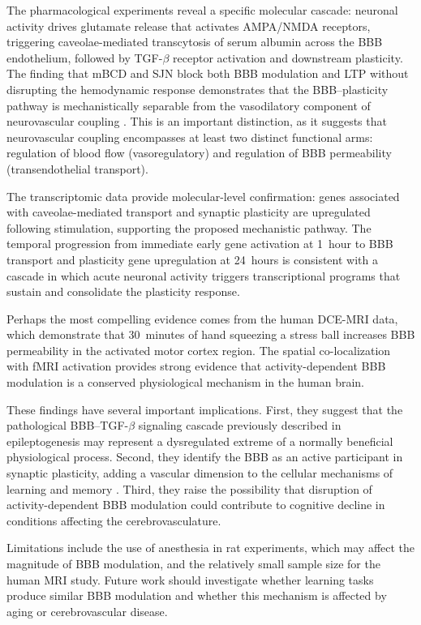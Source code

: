 \documentclass[11pt]{article}
\begin{document}
The pharmacological experiments reveal a specific molecular cascade: neuronal activity drives glutamate release that activates AMPA/NMDA receptors, triggering caveolae-mediated transcytosis of serum albumin across the BBB endothelium, followed by TGF-$\beta$ receptor activation and downstream plasticity. The finding that mBCD and SJN block both BBB modulation and LTP without disrupting the hemodynamic response demonstrates that the BBB--plasticity pathway is mechanistically separable from the vasodilatory component of neurovascular coupling \citep{iadecola2017neurovascular, attwell2010glial}. This is an important distinction, as it suggests that neurovascular coupling encompasses at least two distinct functional arms: regulation of blood flow (vasoregulatory) and regulation of BBB permeability (transendothelial transport).

The transcriptomic data provide molecular-level confirmation: genes associated with caveolae-mediated transport and synaptic plasticity are upregulated following stimulation, supporting the proposed mechanistic pathway. The temporal progression from immediate early gene activation at 1~hour to BBB transport and plasticity gene upregulation at 24~hours is consistent with a cascade in which acute neuronal activity triggers transcriptional programs that sustain and consolidate the plasticity response.

Perhaps the most compelling evidence comes from the human DCE-MRI data, which demonstrate that 30~minutes of hand squeezing a stress ball increases BBB permeability in the activated motor cortex region. The spatial co-localization with fMRI activation provides strong evidence that activity-dependent BBB modulation is a conserved physiological mechanism in the human brain.

These findings have several important implications. First, they suggest that the pathological BBB--TGF-$\beta$ signaling cascade previously described in epileptogenesis \citep{friedman2009blood, ivens2007tgf} may represent a dysregulated extreme of a normally beneficial physiological process. Second, they identify the BBB as an active participant in synaptic plasticity, adding a vascular dimension to the cellular mechanisms of learning and memory \citep{bliss1973long}. Third, they raise the possibility that disruption of activity-dependent BBB modulation could contribute to cognitive decline in conditions affecting the cerebrovasculature.

Limitations include the use of anesthesia in rat experiments, which may affect the magnitude of BBB modulation, and the relatively small sample size for the human MRI study. Future work should investigate whether learning tasks produce similar BBB modulation and whether this mechanism is affected by aging or cerebrovascular disease.
\end{document}

